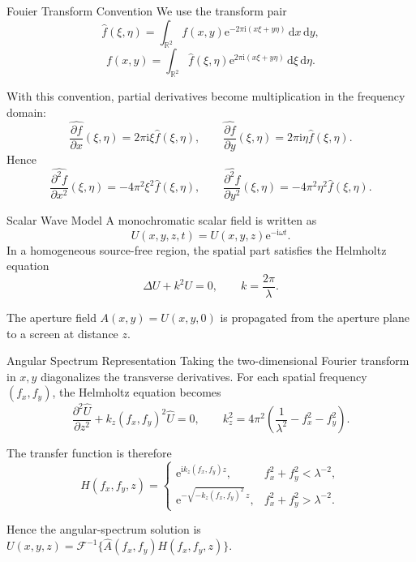 \documentclass[aspectratio=169,11pt]{beamer}
\begin{document}
\begin{frame}{Fouier Transform Convention}
    We use the transform pair
    \[
        \hat{f}(\xi,\eta)
        =
        \int_{\mathbb{R}^2}
        f(x,y)\mathrm{e}^{-2\pi\mathrm{i}(x\xi+y\eta)}
        \,\mathrm{d}x\,\mathrm{d}y,
    \]
    \[
        f(x,y)
        =
        \int_{\mathbb{R}^2}
        \hat{f}(\xi,\eta)\mathrm{e}^{2\pi\mathrm{i}(x\xi+y\eta)}
        \,\mathrm{d}\xi\,\mathrm{d}\eta.
    \]

    \vspace{0.15cm}
    With this convention, partial derivatives become multiplication in the frequency domain:
    \[
        \widehat{\frac{\partial f}{\partial x}}(\xi,\eta)
        =
        2\pi\mathrm{i}\xi\hat{f}(\xi,\eta),\qquad
        \widehat{\frac{\partial f}{\partial y}}(\xi,\eta)
        =
        2\pi\mathrm{i}\eta\hat{f}(\xi,\eta).
    \]
    Hence
    \[
        \widehat{\frac{\partial^2 f}{\partial x^2}}(\xi,\eta)
        =
        -4\pi^2\xi^2\hat{f}(\xi,\eta),\qquad
        \widehat{\frac{\partial^2 f}{\partial y^2}}(\xi,\eta)
        =
        -4\pi^2\eta^2\hat{f}(\xi,\eta).
    \]
\end{frame}

\begin{frame}{Scalar Wave Model}
    A monochromatic scalar field is written as
    \[
        U(x,y,z,t)=U(x,y,z)\mathrm{e}^{-\mathrm{i}\omega t}.
    \]
    In a homogeneous source-free region, the spatial part satisfies the Helmholtz equation
    \[
        \Delta U+k^2U=0,\qquad k=\frac{2\pi}{\lambda}.
    \]

    \vspace{0.2cm}
    The aperture field \(A(x,y)=U(x,y,0)\) is propagated from the aperture plane to a screen at distance
    \(z\).
\end{frame}

\begin{frame}{Angular Spectrum Representation}
    Taking the two-dimensional Fourier transform in \(x,y\) diagonalizes the transverse derivatives.
    For each spatial frequency \((f_x,f_y)\), the Helmholtz equation becomes
    \[
        \frac{\partial^2\hat{U}}{\partial z^2}
        +k_z(f_x,f_y)^2\hat{U}=0,
        \qquad
        k_z^2=4\pi^2\left(\frac{1}{\lambda^2}-f_x^2-f_y^2\right).
    \]

    The transfer function is therefore
    \[
        H(f_x,f_y,z)=
        \begin{cases}
            \mathrm{e}^{\mathrm{i}k_z(f_x,f_y)z}, & f_x^2+f_y^2<\lambda^{-2},\\
            \mathrm{e}^{-\sqrt{-k_z(f_x,f_y)^2}\,z}, & f_x^2+f_y^2>\lambda^{-2}.
        \end{cases}
    \]

    Hence the angular-spectrum solution is \(U(x,y,z)=\mathcal{F}^{-1}\{\hat{A}(f_x,f_y)H(f_x,f_y,z)\}\).
\end{frame}
\end{document}
